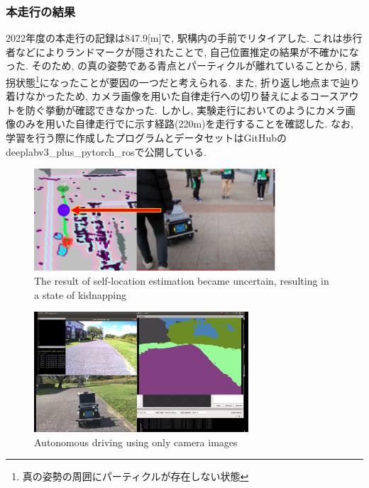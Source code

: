 \documentclass[uplatex, twocolumn, 9pt]{jsproceedings}
\begin{document}
\newpage
\subsubsection{本走行の結果}
2022年度の本走行の記録は847.9[m]で, 駅構内の手前でリタイアした. これは歩行者などによりランドマークが隠されたことで, 自己位置推定の結果が不確かになった. そのため, の真の姿勢である青点とパーティクルが離れていることから, 誘拐状態\footnote[3]{真の姿勢の周囲にパーティクルが存在しない状態}\cite{emcl-thesis}になったことが要因の一つだと考えられる. また, 折り返し地点まで辿り着けなかったため, カメラ画像を用いた自律走行への切り替えによるコースアウトを防ぐ挙動が確認できなかった. しかし, 実験走行においてのようにカメラ画像のみを用いた自律走行でに示す経路(220m)を走行することを確認した. なお, 学習を行う際に作成したプログラムとデータセットはGitHubのdeeplabv3\_plus\_pytorch\_ros\cite{DeeplabV3}で公開している.

\begin{figure}[h]
  \centering

  \includegraphics[width=90mm]{fig/kidnapped5.pdf}
  \caption{The result of self-location estimation became uncertain, resulting in a state of kidnapping}
  \label{fig:kidnapped}%
\end{figure}


\begin{figure}[h]
  \centering
  \includegraphics[width=80mm]{fig/seg-only.pdf}
  \caption{Autonomous driving using only camera images}
  \label{fig:seg-only}%
\end{figure}
\end{document}
